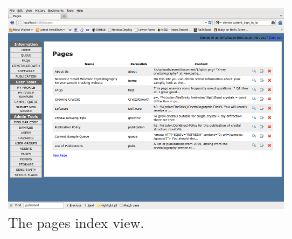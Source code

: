 \documentclass[12pt,twoside]{article}
\begin{document}

\begin{figure}[!htb]
\begin{center}
\includegraphics[width=0.65\textwidth]{pageidx}
\caption{The pages index view.\label{fig:pageidx}}
\end{center}
\end{figure}
\end{document}
